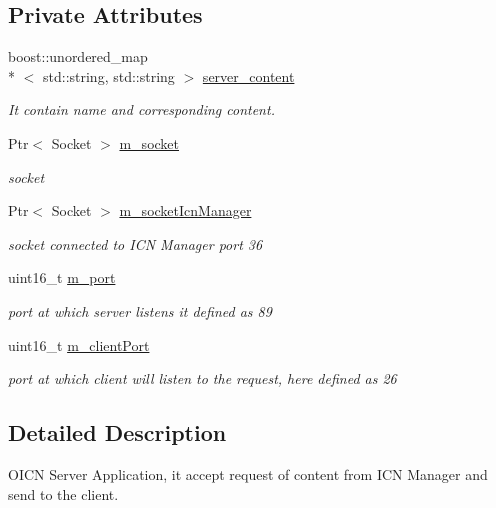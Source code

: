 \subsection*{Private Attributes}
\begin{DoxyCompactItemize}
\item 
boost\-::unordered\-\_\-map\\*
$<$ std\-::string, std\-::string $>$ \hyperlink{classns3_1_1OicnServer_ae9c0c07d3749a24b15ad2cd3e13c52a6}{server\-\_\-content}
\begin{DoxyCompactList}\small\item\em It contain name and corresponding content. \end{DoxyCompactList}\item 
Ptr$<$ Socket $>$ \hyperlink{classns3_1_1OicnServer_ab5844e0fda8496f62cb0bd472a1e4783}{m\-\_\-socket}
\begin{DoxyCompactList}\small\item\em socket \end{DoxyCompactList}\item 
Ptr$<$ Socket $>$ \hyperlink{classns3_1_1OicnServer_a836b1c3feef3d7946fd187dec6e4f229}{m\-\_\-socket\-Icn\-Manager}
\begin{DoxyCompactList}\small\item\em socket connected to I\-C\-N Manager port 36 \end{DoxyCompactList}\item 
uint16\-\_\-t \hyperlink{classns3_1_1OicnServer_af323ee83ebbb895c021b3ba2eadae2cc}{m\-\_\-port}
\begin{DoxyCompactList}\small\item\em port at which server listens it defined as 89 \end{DoxyCompactList}\item 
uint16\-\_\-t \hyperlink{classns3_1_1OicnServer_a3c7e8287c7efc4790e2a83c67163daca}{m\-\_\-client\-Port}
\begin{DoxyCompactList}\small\item\em port at which client will listen to the request, here defined as 26 \end{DoxyCompactList}\end{DoxyCompactItemize}


\subsection{Detailed Description}
O\-I\-C\-N Server Application, it accept request of content from I\-C\-N Manager and send to the client. 

